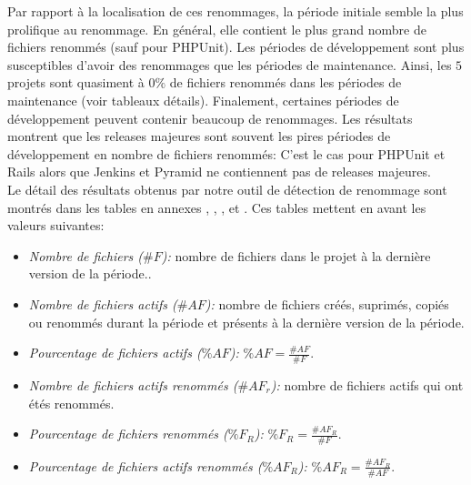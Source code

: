 Par rapport à la localisation de ces renommages, la période initiale semble la plus prolifique au renommage. En général, elle contient le plus grand nombre de fichiers renommés (sauf pour PHPUnit). Les périodes de développement sont plus susceptibles d'avoir des renommages que les périodes de maintenance. Ainsi, les $5$ projets sont quasiment à $0\%$ de fichiers renommés dans les périodes de maintenance (voir tableaux détails). Finalement, certaines périodes de développement peuvent contenir beaucoup de renommages. Les résultats montrent que les releases majeures sont souvent les pires périodes de développement en nombre de fichiers renommés: C'est le cas pour PHPUnit et Rails alors que Jenkins et Pyramid ne contiennent pas de releases majeures.\\

Le détail des résultats obtenus par notre outil de détection de renommage sont montrés dans les tables en annexes , , ,  et . Ces tables mettent en avant les valeurs suivantes:\\

\begin{itemize}
\item \emph{Nombre de fichiers ($\#F$):} nombre de fichiers dans le projet à la dernière version de la période..
\item \emph{Nombre de fichiers actifs ($\#AF$):} nombre de fichiers créés, suprimés, copiés ou renommés durant la période et présents à la dernière version de la période.
\item \emph{Pourcentage de fichiers actifs ($\%AF$):} $\%AF = \frac{\#AF}{\#F}$.
\item \emph{Nombre de fichiers actifs renommés ($\#AF_{r}$):} nombre de fichiers actifs qui ont étés renommés.
\item \emph{Pourcentage de fichiers renommés ($\%F_{R}$):} $\%F_{R} = \frac{\#AF_{R}}{\#F}$.
\item \emph{Pourcentage de fichiers actifs renommés ($\%AF_{R}$):} $\%AF_{R} = \frac{\#AF_{R}}{\#AF}$.
\end{itemize}


